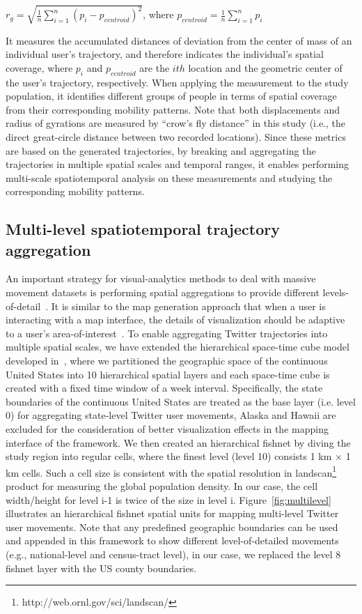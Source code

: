 \documentclass[ijgi,article,submit,moreauthors,pdftex,10pt,a4paper]{mdpi}
\theoremstyle{mdpi}
\newcounter{ex}
\newcounter{re}
\theoremstyle{mdpidefinition}
\begin{document}
$r_{g} = \sqrt{\frac{1}{n}\sum_{i=1}^{n}(p_{i} - p_{centroid})^{2}}$, where $p_{centroid} = \frac{1}{n}\sum_{i=1}^{n}p_{i}$
\newline

\noindent It measures the accumulated distances of deviation from the center of mass of an individual user's trajectory, and therefore indicates the individual's spatial coverage, where $p_{i}$ and $p_{centroid}$ are the $ith$ location and the geometric center of the user's trajectory, respectively.
When applying the measurement to the study population, it identifies different groups of people in terms of spatial coverage from their corresponding mobility patterns. Note that both displacements and radius of gyrations are measured by ``crow's fly distance'' in this study (i.e., the direct great-circle distance between two recorded locations).
Since these metrics are based on the generated trajectories, by breaking and aggregating the trajectories in multiple spatial scales and temporal ranges, it enables performing multi-scale spatiotemporal analysis on these measurements and studying the corresponding mobility patterns. 

\subsection{Multi-level spatiotemporal trajectory aggregation}
An important strategy for visual-analytics methods to deal with massive movement datasets is performing spatial aggregations to provide different levels-of-detail~\cite{andrienko2007designing,andrienko2007visual}.
It is similar to the map generation approach that when a user is interacting with a map interface, the details of visualization should be adaptive to a user's area-of-interest~\cite{buttenfield1991map}.
To enable aggregating Twitter trajectories into multiple spatial scales, we have extended the hierarchical space-time cube model developed in~\cite{cao2014scalable}, where we partitioned the geographic space of the continuous United States into 10 hierarchical spatial layers and each space-time cube is created with a fixed time window of a week interval. 
Specifically, the state boundaries of the continuous United States are treated as the base layer (i.e. level 0) for aggregating state-level Twitter user movements, Alaska and Hawaii are excluded for the consideration of better visualization effects in the mapping interface of the framework.
We then created an hierarchical fishnet by diving the study region into regular cells, where the finest level (level 10) consists 1 km $\times$ 1 km cells.
Such a cell size is consistent with the spatial resolution in landscan\footnote{http://web.ornl.gov/sci/landscan/} product for measuring the global population density.
In our case, the cell width/height for level i-1 is twice of the size in level i.
Figure~\ref{fig:multilevel} illustrates an hierarchical fishnet spatial units for mapping multi-level Twitter user movements.
Note that any predefined geographic boundaries can be used and appended in this framework to show different level-of-detailed movements (e.g., national-level and census-tract level), in our case, we replaced the level 8 fishnet layer with the US county boundaries.
\end{document}
